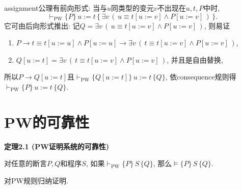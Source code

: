\documentclass[UTF8]{ctexart}
\begin{document}
\vspace{15pt}

assignment公理有前向形式: 当与$u$同类型的变元$v$不出现在$u,t,P$中时,
\[
    \vdash_{\mathrm{PW}}
    \{P\}\,u:=t\,\{\,\exists v\,(\,u\equiv t[u:=v]\land P[u:=v]\,)\,\}.
\]
它可由后向形式推出: 记$Q=\exists v\,(\,u\equiv t[u:=v]\land P[u:=v]\,)$, 则易证
\begin{enumerate}
    \item $P\to t\equiv t[u:=u]\land P[u:=u]\to
    \exists v\,(\,t\equiv t[u:=v]\land P[u:=v]\,)$,
    \item $Q[u:=t]=\exists v\,(\,t\equiv t[u:=v]\land P[u:=v]\,)$,
    并且是自由替换,
\end{enumerate}
所以$P\to Q[u:=t]$且$\vdash_{\mathrm{PW}}\{Q[u:=t]\}\,u:=t\,\{Q\}$,
依consequence规则得$\vdash_{\mathrm{PW}}\{P\}\,u:=t\,\{Q\}$.





\newpage

\section{PW的可靠性}

\hypertarget{sec:定理2.1}{}
\noindent\textbf{定理2.1 (PW证明系统的可靠性)}

对任意的断言$P,Q$和程序$S$, 如果$\vdash_{\mathrm{PW}}\{P\}\,S\,\{Q\}$,
那么$\models\{P\}\,S\,\{Q\}$.


对PW规则归纳证明.
\end{document}

